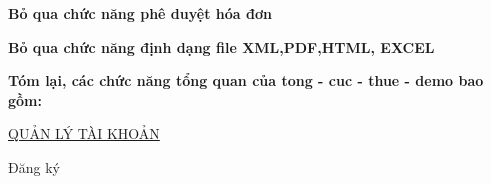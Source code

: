 \textbf{Bỏ qua chức năng phê duyệt hóa đơn}



















\textbf{Bỏ qua chức năng định dạng file XML,PDF,HTML, EXCEL}



















\textbf{Tóm lại, các chức năng tổng quan của tong - cuc - thue - demo bao gồm:}



















\underline{\textsc{QUẢN LÝ TÀI KHOẢN}}



















Đăng ký





































